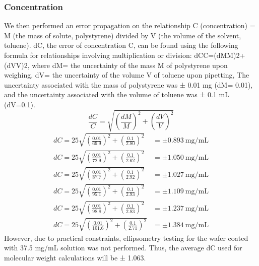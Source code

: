 \documentclass{article}
\begin{document}
\begin{multicols}{2}
                \subsubsection{Concentration}
                    We then performed an error propagation on the relationship C (concentration) = M (the mass of solute, polystyrene) divided by V (the volume of the solvent, toluene). dC, the error of concentration C, can be found using the following formula for relationships involving multiplication or division: dCC=(dMM)2+(dVV)2, where dM= the uncertainty of the mass M of polystyrene upon weighing, dV= the uncertainty of the volume V of toluene upon pipetting, The uncertainty associated with the mass of polystyrene was ± 0.01 mg (dM= 0.01), and the uncertainty associated with the volume of toluene was ± 0.1 mL (dV=0.1). 
                    \begin{equation}
                        \frac{dC}{C} = \sqrt{(\frac{dM}{M})^2 + (\frac{dV}{V})^2}
                    \end{equation}
                    \begin{align}
                        dC = 25\sqrt{(\frac{0.01}{69.9})^2 + (\frac{0.1}{2.80})^2} &= \pm \qty{0.893}{\milli\gram\per\milli\liter}\\
                        dC = 25\sqrt{(\frac{0.01}{72.9})^2 + (\frac{0.1}{2.62})^2} &= \pm \qty{1.050}{\milli\gram\per\milli\liter}\\
                        dC = 25\sqrt{(\frac{0.01}{87.7})^2 + (\frac{0.1}{2.92})^2} &= \pm \qty{1.027}{\milli\gram\per\milli\liter}\\
                        dC = 25\sqrt{(\frac{0.01}{95.1})^2 + (\frac{0.1}{2.93})^2} &= \pm \qty{1.109}{\milli\gram\per\milli\liter}\\
                        dC = 25\sqrt{(\frac{0.01}{98.8})^2 + (\frac{0.1}{2.83})^2} &= \pm \qty{1.237}{\milli\gram\per\milli\liter}\\
                        dC = 25\sqrt{(\frac{0.01}{101.6})^2 + (\frac{0.1}{2.71})^2} &= \pm \qty{1.384}{\milli\gram\per\milli\liter}
                    \end{align}
                    However, due to practical constraints, ellipsometry testing for the wafer coated with 37.5 mg/mL solution was not performed. Thus, the average dC used for molecular weight calculations will be ± 1.063.

\end{multicols}
\end{document}
